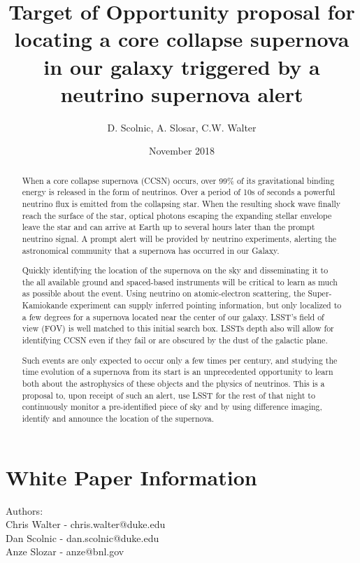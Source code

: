\documentclass[11pt]{article}
\title{Target of Opportunity proposal for locating a core collapse
  supernova in our galaxy triggered by a neutrino supernova alert}
\author{D. Scolnic, A. Slosar, C.W. Walter}
\date{ November 2018}
\begin{document}
\maketitle

\begin{abstract}

  When a core collapse supernova (CCSN) occurs, over 99\% of its
  gravitational binding energy is released in the form of neutrinos.
  Over a period of 10s of seconds a powerful neutrino flux is emitted
  from the collapsing star.  When the resulting shock wave finally
  reach the surface of the star, optical photons escaping the
  expanding stellar envelope leave the star and can arrive at Earth up
  to several hours later than the prompt neutrino signal.  A prompt
  alert will be provided by neutrino experiments, alerting the
  astronomical community that a supernova has occurred in our Galaxy.

  Quickly identifying the location of the supernova on the sky and
  disseminating it to the all available ground and spaced-based
  instruments will be critical to learn as much as possible about the
  event. Using neutrino on atomic-electron scattering, the
  Super-Kamiokande experiment can supply inferred pointing information,
  but only localized to a few degrees for a supernova located near
  the center of our galaxy.  LSST's field of view (FOV) is well
  matched to this initial search box.  LSSTs depth also will allow for
  identifying CCSN even if they fail or are obscured by the dust of
  the galactic plane.

  Such events are only expected to occur only a few times per century,
  and studying the time evolution of a supernova from its start is an
  unprecedented opportunity to learn both about the astrophysics of
  these objects and the physics of neutrinos.  This is a proposal to,
  upon receipt of such an alert, use LSST for the rest of that night
  to continuously monitor a pre-identified piece of sky and by using
  difference imaging, identify and announce the location of the
  supernova.
  
\end{abstract}

\section{White Paper Information}

\noindent
Authors: \\

\noindent
Chris Walter - chris.walter@duke.edu \\
Dan Scolnic - dan.scolnic@duke.edu \\
Anze Slozar - anze@bnl.gov \\
\end{document}
